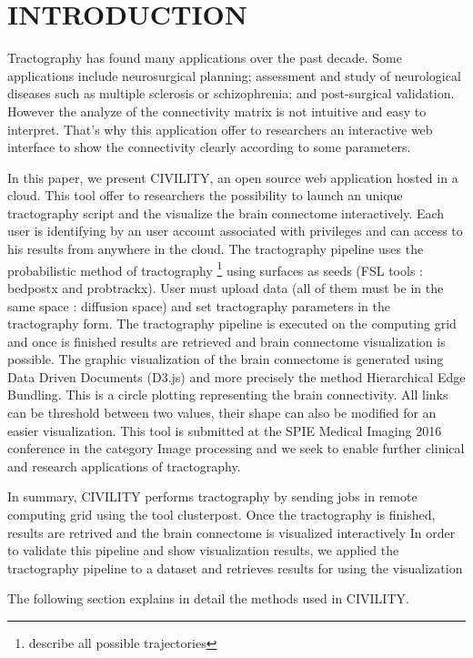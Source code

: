 \documentclass[]{spie}  %
\begin{document}
\section{INTRODUCTION}
\label{sec:intro}

Tractography has found many applications over the past decade. Some applications include neurosurgical planning; assessment and study of neurological diseases such as multiple sclerosis  or schizophrenia; and post-surgical validation. However the analyze of the connectivity matrix is not intuitive and easy to interpret. That's why this application offer to researchers an interactive web interface to show the connectivity clearly according to some parameters. 

In this paper, we present CIVILITY, an open source web application hosted in a cloud. This tool offer to researchers the possibility to launch an unique tractography script and the visualize the brain connectome interactively. Each user is identifying by an user account associated with privileges and can access to his results from anywhere in the cloud.
The tractography pipeline uses the probabilistic method  of tractography \footnote{describe all possible trajectories} using surfaces as seeds (FSL tools : bedpostx and probtrackx). User must upload data (all of them must be in the same space : diffusion space) and set tractography parameters in the tractography form. The tractography pipeline is executed on the computing grid and once is finished results are retrieved and brain connectome visualization is possible. 
The graphic visualization of the brain connectome is generated using Data Driven Documents (D3.js) and more precisely the method Hierarchical Edge Bundling. This is a circle plotting representing the brain connectivity. All links can be threshold between two values, their shape can also be modified for an easier visualization. This tool is submitted at the SPIE Medical Imaging 2016 conference in the category Image processing and we seek to enable further clinical and research applications of tractography.

In summary, CIVILITY performs tractography by sending jobs in remote computing grid using the tool clusterpost. Once the tractography is finished, results are retrived and the brain connectome is visualized interactively
In order to validate this pipeline and show visualization results, we applied the tractography pipeline to a dataset and retrieves results for using the visualization 

The following section explains in detail the methods used in CIVILITY.
\end{document}
